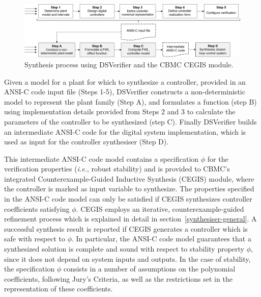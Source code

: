 \documentclass{sig-alternate-05-2015}
\begin{document}
\begin{figure}[t]
\centering
\includegraphics[width=\textwidth]{figures/verification-flow.png}
\vspace{1ex}
\caption{Synthesis process using DSVerifier and the CBMC CEGIS module.}
\label{DSVerifier_process}
\end{figure}


Given a model for a plant for which to synthesize a controller, provided in
an ANSI-C code input file (Steps 1-5), DSVerifier constructs a
non-deterministic model to represent the plant family (Step A), and
formulates a function (step B) using implementation details provided from
Steps $2$ and $3$ to calculate the parameters of the controller to be
synthesized (step C).  Finally DSVerifier builds an intermediate ANSI-C code
for the digital system implementation, which is used as input for the
controller synthesiser (Step D).

This intermediate ANSI-C code model contains a specification $\phi$ for the
verification properties ({\it i.e.}, robust stability) and is provided to
CBMC's~\cite{ClarkeKL04} integrated Counterexample-Guided Inductive
Synthesis (CEGIS) module, where the controller is marked as input variable
to synthesize.  The properties specified in the ANSI-C code model can only
be satisfied if CEGIS synthesizes controller coefficients satisfying $\phi$. 
CEGIS employs an iterative, counterexample-guided refinement process which
is explained in detail in section~\ref{synthesiser-general}.  A successful
synthesis result is reported if CEGIS generates a controller which is safe
with respect to $\phi$.  In particular, the ANSI-C code model guarantees
that a synthesized solution is complete and sound with respect to stability
property $\phi$, since it does not depend on system inputs and outputs.  In
the case of stability, the specification $\phi$ consists in a number of
assumptions on the polynomial coefficients, following Jury's Criteria, as
well as the restrictions set in the representation of these coefficients.
\end{document}
